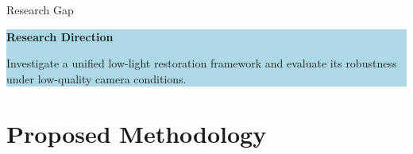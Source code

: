 \documentclass[
    11pt,%
    aspectratio=169,%
]{beamer}
\begin{document}
\begin{frame}{Research Gap}
\begin{center}

\end{center}

\vspace{0.22cm}


\begin{beamercolorbox}[
    rounded=true,
    sep=0.08cm,
    wd=\textwidth
]{}

\colorbox{LightBlue}{
    \parbox{\dimexpr\textwidth-2\fboxsep\relax}{
        {\color{Navy}\bfseries
        Research Direction}

        \vspace{0.05cm}

        \fontsize{9}{11}\selectfont

        Investigate a unified low-light restoration
        framework and evaluate its robustness
        under low-quality camera conditions.
    }
}

\end{beamercolorbox}

\end{frame}

\section{Proposed Methodology}
\end{document}
